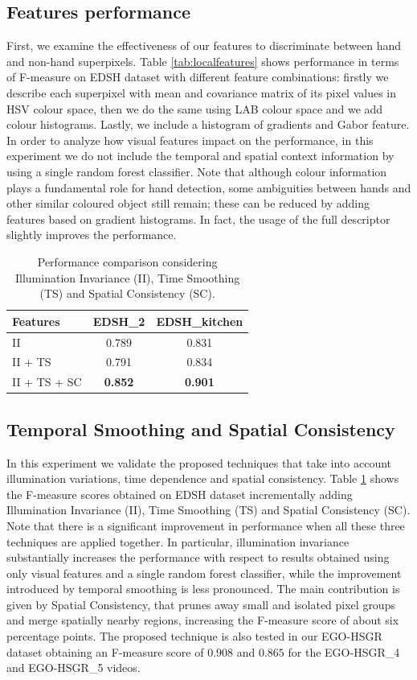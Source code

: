\subsection{Features performance}

First, we examine the effectiveness of our features to discriminate between hand and non-hand superpixels. 
Table \ref{tab:localfeatures} shows performance in terms of F-measure on EDSH dataset with different feature combinations: firstly we describe each superpixel with mean and covariance matrix of its pixel values in HSV colour space, then we do the same using LAB colour space and we add colour histograms. Lastly, we include a histogram of gradients and Gabor feature.
In order to analyze how visual features impact on the performance, in this experiment we do not include the temporal and spatial context information by using a single random forest classifier.     
Note that although colour information plays a fundamental role for hand detection, some ambiguities between hands and other similar coloured object still remain; these can be reduced by adding features based on gradient histograms. In fact, the usage of the full descriptor slightly improves the performance.      

\begin{table}
 \centering
 \begin{tabular}{|l|c|c|}
 \hline
 \textbf{Features} 	& \textbf{EDSH\_2} & \textbf{EDSH\_{kitchen}}	\\ \hline\hline
 II	& 0.789 & 	0.831		\\ \hline
 II + TS	& 0.791	&	0.834 \\ \hline
 II + TS + SC &	\textbf{0.852} &	\textbf{0.901}	\\ \hline  
 \end{tabular}
 \caption{Performance comparison considering Illumination Invariance (II), Time Smoothing (TS) and Spatial Consistency (SC).}\label{tab:context}
\end{table}


\subsection{Temporal Smoothing and Spatial Consistency}
In this experiment we validate the proposed techniques that take into account illumination variations, time dependence and spatial consistency.
Table \ref{tab:context} shows the F-measure scores obtained on EDSH dataset incrementally adding Illumination Invariance (II), Time Smoothing (TS) and Spatial Consistency (SC). 
Note that there is a significant improvement in performance when all these three techniques are applied together.   
In particular, illumination invariance substantially increases the performance with respect to results obtained using only visual features and a single random forest classifier, while the improvement introduced by temporal smoothing is less pronounced. The main contribution is given by Spatial Consistency, that prunes away small and isolated pixel groups and merge spatially nearby regions, increasing the F-measure score of about six percentage points.
The proposed technique is also tested in our EGO-HSGR dataset obtaining an F-measure score of $0.908$ and $0.865$ for the EGO-HSGR\_{4} and EGO-HSGR\_{5} videos.        


